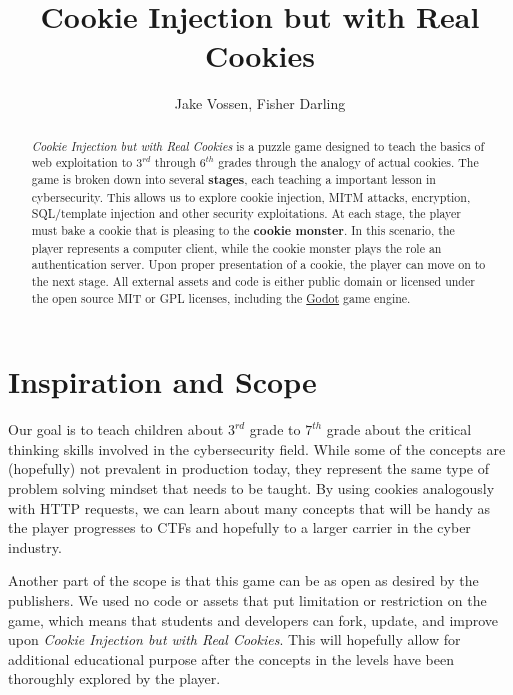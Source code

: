\documentclass{article}
\begin{document}
\title{Cookie Injection but with Real Cookies}
\author{Jake Vossen, Fisher Darling}

\maketitle

\begin{abstract}
  
\textit{Cookie Injection but with Real Cookies} is a puzzle game
designed to teach the basics of web exploitation to $3^{rd}$ through
$6^{th}$ grades through the analogy of actual cookies. The game is
broken down into several \textbf{stages}, each teaching a important
lesson in cybersecurity. This allows us to explore cookie injection,
MITM attacks, encryption, SQL/template injection and other security
exploitations. At each stage, the player must bake a cookie that is
pleasing to the \textbf{cookie monster}. In this scenario, the player
represents a computer client, while the cookie monster plays the role
an authentication server. Upon proper presentation of a cookie, the
player can move on to the next stage. All external assets and code is
either public domain or licensed under the open source MIT or GPL
licenses, including the \href{https://godotengine.org}{Godot} game
engine.



\end{abstract}

\section{Inspiration and Scope}

Our goal is to teach children about $3^{rd}$ grade to $7^{th}$ grade
about the critical thinking skills involved in the cybersecurity
field. While some of the concepts are (hopefully) not prevalent in
production today, they represent the same type of problem solving
mindset that needs to be taught. By using cookies analogously with
HTTP requests, we can learn about many concepts that will be handy as
the player progresses to CTFs and hopefully to a larger carrier in the
cyber industry.

Another part of the scope is that this game can be as open as desired
by the publishers. We used no code or assets that put limitation or
restriction on the game, which means that students and developers can
fork, update, and improve upon \textit{Cookie Injection but with Real
Cookies}. This will hopefully allow for additional educational purpose
after the concepts in the levels have been thoroughly explored by the
player.
\end{document}
